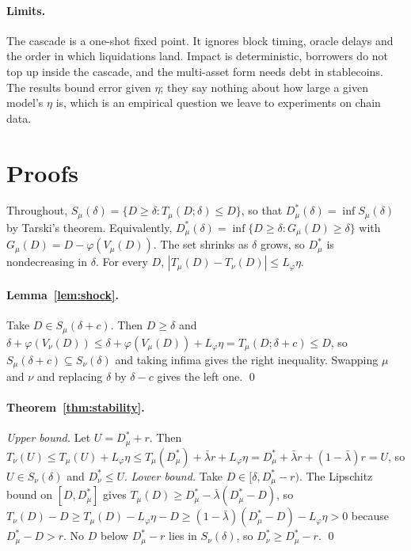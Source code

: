 \documentclass[letterpaper]{article} %
\theoremstyle{remark}
\newcommand{\Dstar}[1]{D^{\ast}_{#1}}
\newcommand{\Lp}{L_\varphi}
\newcommand{\lb}{\bar\lambda}
\begin{document}
\paragraph{Limits.} The cascade is a one-shot fixed point. It ignores block timing, oracle delays and the order in which liquidations land. Impact is deterministic, borrowers do not top up inside the cascade, and the multi-asset form needs debt in stablecoins. The results bound error given $\eta$; they say nothing about how large a given model's $\eta$ is, which is an empirical question we leave to experiments on chain data.



\appendix

\section{Proofs}

Throughout, $S_\mu(\delta)=\{D\ge\delta:T_\mu(D;\delta)\le D\}$, so that $\Dstar{\mu}(\delta)=\inf S_\mu(\delta)$ by Tarski's theorem. Equivalently, $\Dstar{\mu}(\delta)=\inf\{D\ge\delta:G_\mu(D)\ge\delta\}$ with $G_\mu(D)=D-\varphi(V_\mu(D))$. The set shrinks as $\delta$ grows, so $\Dstar{\mu}$ is nondecreasing in $\delta$. For every $D$, $|T_\mu(D)-T_\nu(D)|\le\Lp\eta$.

\paragraph{Lemma~\ref{lem:shock}.} Take $D\in S_\mu(\delta+c)$. Then $D\ge\delta$ and $\delta+\varphi(V_\nu(D))\le\delta+\varphi(V_\mu(D))+\Lp\eta=T_\mu(D;\delta+c)\le D$, so $S_\mu(\delta+c)\subseteq S_\nu(\delta)$ and taking infima gives the right inequality. Swapping $\mu$ and $\nu$ and replacing $\delta$ by $\delta-c$ gives the left one. \qed

\paragraph{Theorem~\ref{thm:stability}.} \emph{Upper bound.} Let $U=\Dstar{\mu}+r$. Then $T_\nu(U)\le T_\mu(U)+\Lp\eta\le T_\mu(\Dstar{\mu})+\lb r+\Lp\eta=\Dstar{\mu}+\lb r+(1-\lb)r=U$, so $U\in S_\nu(\delta)$ and $\Dstar{\nu}\le U$.
\emph{Lower bound.} Take $D\in[\delta,\Dstar{\mu}-r)$. The Lipschitz bound on $[D,\Dstar{\mu}]$ gives $T_\mu(D)\ge\Dstar{\mu}-\lb(\Dstar{\mu}-D)$, so $T_\nu(D)-D\ge T_\mu(D)-\Lp\eta-D\ge(1-\lb)(\Dstar{\mu}-D)-\Lp\eta>0$ because $\Dstar{\mu}-D>r$. No $D$ below $\Dstar{\mu}-r$ lies in $S_\nu(\delta)$, so $\Dstar{\nu}\ge\Dstar{\mu}-r$. \qed
\end{document}
